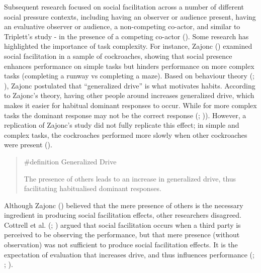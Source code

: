 \documentclass[
  letterpaper,
]{book}
\begin{document}
Subsequent research focused on social facilitation across a number of
different social pressure contexts, including having an observer or
audience present, having an evaluative observer or audience, a
non-competing co-actor, and similar to Triplett's study - in the
presence of a competing co-actor (). Some research has highlighted the importance of task complexity.
For instance, Zajonc () examined social
facilitation in a sample of cockroaches, showing that social presence
enhances performance on simple tasks but hinders performance on more
complex tasks (completing a runway vs completing a maze). Based on
behaviour theory (;
), Zajonc postulated that
``generalized drive'' is what motivates habits. According to Zajonc's
theory, having other people around increases generalized drive, which
makes it easier for habitual dominant responses to occur. While for more
complex tasks the dominant response may not be the correct response
(;
)). However, a replication of
Zajonc's study did not fully replicate this effect; in simple and
complex tasks, the cockroaches performed more slowly when other
cockroaches were present ().

\begin{quote}
\label{def-generalizeddrive}{\#definition} Generalized
Drive

The presence of others leads to an increase in generalized drive, thus
facilitating habitualised dominant responses.
\end{quote}

Although Zajonc () believed that the
mere presence of others is the necessary ingredient in producing social
facilitation effects, other researchers disagreed. Cottrell et al.
(;
) argued that social facilitation
occurs when a third party is perceived to be observing the performance,
but that mere presence (without observation) was not sufficient to
produce social facilitation effects. It is the expectation of evaluation
that increases drive, and thus influences performance
(;
;
).
\end{document}
